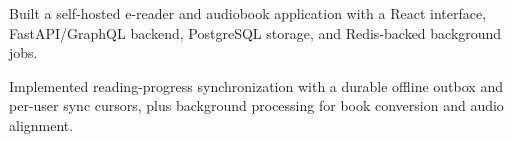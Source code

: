 \begin{bullets}
  \item Built a self-hosted e-reader and audiobook application with a React interface, FastAPI/GraphQL backend, PostgreSQL storage, and Redis-backed background jobs.
  \item Implemented reading-progress synchronization with a durable offline outbox and per-user sync cursors, plus background processing for book conversion and audio alignment.
\end{bullets}
